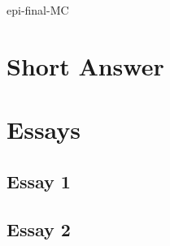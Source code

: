 \documentclass{article}
\newcommand{\MCinput}[1]{}
\newcommand{\oneOfThese}[2]{#1#2}
\renewcommand{\oneOfThese}[2]{#2}
\begin{document}
\begin{AcroScoreProblem}{epi-final-MC}
\begin{enumerate}
\end{enumerate}

\newpage

\section*{Short Answer}

\begin{multicols}{2}
\oneOfThese{\MCinput{126}}{\MCinput{127}}
\end{multicols}

\newpage
\section*{Essays}

\renewcommand{\TextEntry}[1][]{} %

\subsection*{Essay 1}
\MCinput{DTK101}

\vspace*{2in}

\subsection*{Essay 2}
\begin{multicols}{2}
\MCinput{DTK105}
\end{multicols}


\end{AcroScoreProblem}
\finishAcroScore
\end{document}

